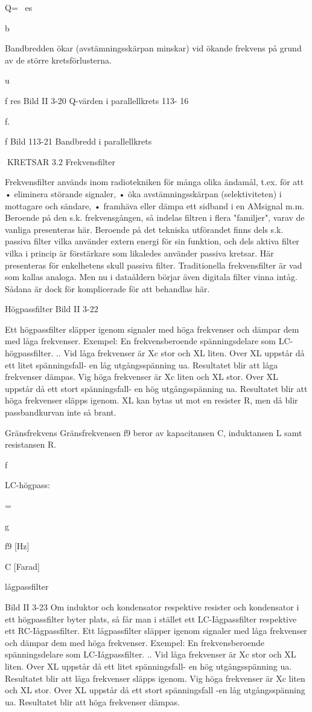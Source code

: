 \documentclass[a4paper,twoside,twocolumn,openright]{book}
\begin{document}
{{{{{{Q= ~es

b

Bandbredden ökar (avstämningsskärpan
minskar) vid ökande frekvens på grund av de
större kretsförlusterna.

u

f res
Bild II 3-20 Q-värden i parallellkrets
113- 16

f.

f
Bild 113-21 Bandbredd i parallellkrets

KRETSAR
3.2 Frekvensfilter

Frekvensfilter används inom radiotekniken
för många olika ändamål, t.ex. för att
• eliminera störande signaler,
• öka avstämningsskärpan (selektiviteten) i
mottagare och sändare,
• framhäva eller dämpa ett sidband i en AMsignal m.m.
Beroende på den s.k. frekvensgången,
så indelas filtren i flera "familjer", varav de
vanliga presenteras här.
Beroende på det tekniska utförandet finns
dels s.k. passiva filter vilka använder extern
energi för sin funktion, och dels aktiva filter
vilka i princip är förstärkare som likaledes
använder passiva kretsar. Här presenteras
för enkelhetens skull passiva filter.
Traditionella frekvensfilter är vad som
kallas analoga. Men nu i dataåldern börjar
även digitala filter vinna intåg. Sådana är
dock för komplicerade för att behandlas här.

Högpassfilter
Bild II 3-22

Ett högpassfilter släpper igenom signaler
med höga frekvenser och dämpar dem med
låga frekvenser.
Exempel: En frekvensberoende spänningsdelare som LC-högpassfilter.
.. Vid låga frekvenser är Xc stor och XL liten.
Over XL uppstår då ett litet spänningsfall- en
låg utgångsspänning ua. Resultatet blir att
låga frekvenser dämpas.
Vig höga frekvenser är Xc liten och XL
stor. Over XL uppstår då ett stort spänningsfall- en hög utgångsspänning ua. Resultatet
blir att höga frekvenser släpps igenom.
XL kan bytas ut mot en resister R, men då
blir passbandkurvan inte så brant.

Gränsfrekvens
Gränsfrekvensen f9 beror av kapacitansen
C, induktansen L samt resistansen R.

f

LC-högpass:

=

g

f9 [Hz]

C [Farad]

lågpassfilter

Bild II 3-23
Om induktor och kondensator respektive
resister och kondensator i ett högpassfilter
byter plats, så får man i stället ett LC-Iågpassfilter respektive ett RC-Iågpassfilter.
Ett lågpassfilter släpper igenom signaler
med låga frekvenser och dämpar dem med
höga frekvenser.
Exempel: En frekvensberoende spänningsdelare som LC-Iågpassfilter.
.. Vid låga frekvenser är Xc stor och XL liten.
Over XL uppstår då ett litet spänningsfall- en
hög utgångsspänning ua. Resultatet blir att
låga frekvenser släpps igenom.
Vig höga frekvenser är Xc liten och XL
stor. Over XL uppstår då ett stort spänningsfall -en låg utgångsspänning ua. Resultatet
blir att höga frekvenser dämpas.

}}}}}}
\end{document}
